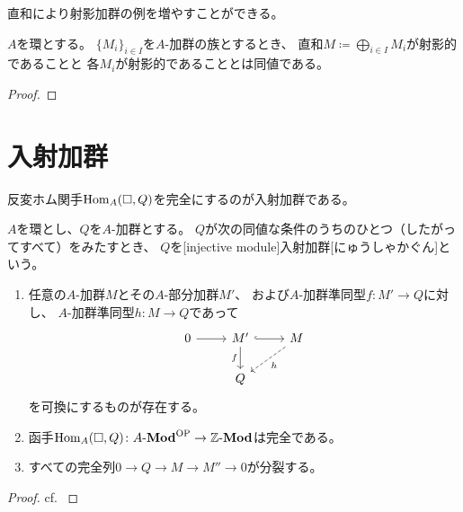 \documentclass[report]{jlreq}
\begin{document}
直和により射影加群の例を増やすことができる。

\begin{proposition}[射影的な直和加群]
    $A$を環とする。
    $\{ M_i \}_{i \in I}$を$A$-加群の族とするとき、
    直和$M \coloneqq \bigoplus_{i \in I} M_i$が射影的であることと
    各$M_i$が射影的であることとは同値である。
\end{proposition}

\begin{proof}
    \TODO{}
\end{proof}

%
\section{入射加群}

反変ホム関手$\operatorname{Hom}_A(\Box, Q)$を完全にするのが入射加群である。

\begin{definition}[入射加群]
    $A$を環とし、$Q$を$A$-加群とする。
    $Q$が次の同値な条件のうちのひとつ（したがってすべて）をみたすとき、
    $Q$を[injective module]{入射加群}[にゅうしゃかぐん]という。
    \begin{enumerate}
        \item 任意の$A$-加群$M$とその$A$-部分加群$M'$、
            および$A$-加群準同型$f \colon M' \to Q$に対し、
            $A$-加群準同型$h \colon M \to Q$であって
            \begin{equation}
                \begin{tikzcd}
                    0 \ar{r} & M' \ar{d}[swap]{f} \ar[hook]{r} & M \ar[dashed]{ld}{h} \\
                    & Q
                \end{tikzcd}
            \end{equation}
            を可換にするものが存在する。
        \item 函手$\operatorname{Hom}_A(\Box, Q) \colon A\text{-}\mathbf{Mod}^{\mathrm{OP}} \to \mathbb{Z}\text{-}\mathbf{Mod}$は完全である。
        \item すべての完全列$0 \to Q \to M \to M'' \to 0$が分裂する。
    \end{enumerate}
\end{definition}

\begin{proof}
    cf. \cite[p.782]{Lan02}
\end{proof}
\end{document}

